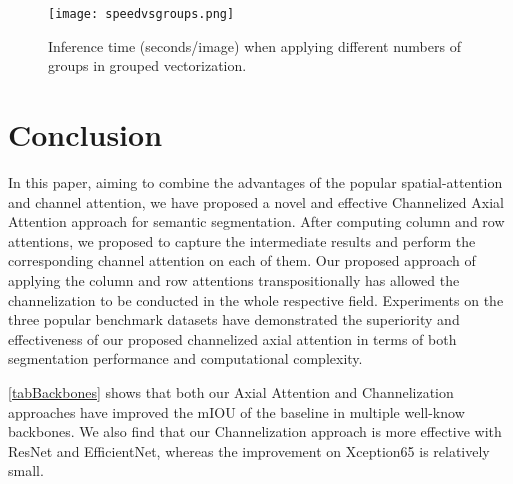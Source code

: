 \documentclass[journal]{IEEEtran}
\begin{document}
\begin{figure}[t]
	\centering
	\texttt{[image: speedvsgroups.png]}
	\caption{Inference time (seconds/image) when applying different numbers of groups in grouped vectorization.}
\label{figSpeedVSGroups}
\end{figure}

\section{Conclusion}
\label {secConclusion}

In this paper, aiming to combine the advantages of the popular spatial-attention and channel attention, we have proposed a novel and effective Channelized Axial Attention approach for semantic segmentation. 
After computing column and row attentions, we proposed to capture the intermediate results and perform the corresponding channel attention on each of them. 
Our proposed approach of applying the column and row attentions transpositionally has allowed the channelization to be conducted in the whole respective field. 
Experiments on the three popular benchmark datasets have demonstrated the superiority and effectiveness of our proposed channelized axial attention in terms of both segmentation performance and computational complexity. 










\appendices






\tablename{ \ref{tabBackbones}} shows that both our Axial Attention and Channelization approaches have improved the mIOU of the baseline in multiple well-know backbones. 
We also find that our Channelization approach is more effective with ResNet and EfficientNet, whereas the improvement on Xception65 is relatively small. 



\ifCLASSOPTIONcaptionsoff
  \newpage
\fi













\end{document}
